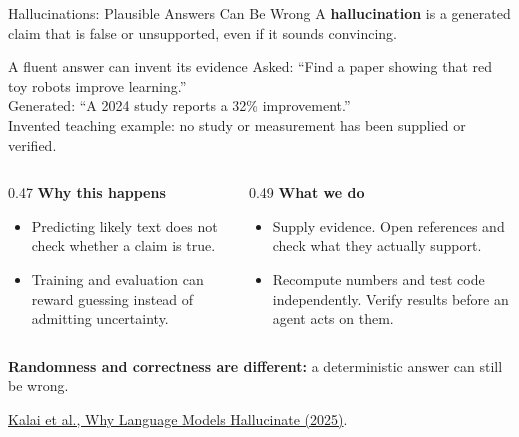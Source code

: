 \documentclass[aspectratio=169]{beamer}
\begin{document}
\begin{frame}{Hallucinations: Plausible Answers Can Be Wrong}
  \small A \textbf{hallucination} is a generated claim that is false or unsupported, even if it sounds convincing.
  \begin{block}{A fluent answer can invent its evidence}
    \small Asked: ``Find a paper showing that red toy robots improve learning.''\\
    Generated: ``A 2024 study reports a 32\% improvement.''\\
    {\footnotesize Invented teaching example: no study or measurement has been supplied or verified.}
  \end{block}
  \begin{columns}[T,onlytextwidth]
    \begin{column}{0.47\textwidth}
      \small \textbf{Why this happens}
      \begin{itemize}
        \item Predicting likely text does not check whether a claim is true.
        \item Training and evaluation can reward guessing instead of admitting uncertainty.
      \end{itemize}
    \end{column}
    \begin{column}{0.49\textwidth}
      \small \textbf{What we do}
      \begin{itemize}
        \item Supply evidence. Open references and check what they actually support.
        \item Recompute numbers and test code independently. Verify results before an agent acts on them.
      \end{itemize}
    \end{column}
  \end{columns}
  \vspace{0.3em}
  \small \textbf{Randomness and correctness are different:} a deterministic answer can still be wrong.
  \par\vspace{0.2em}
  {\scriptsize \href{https://arxiv.org/abs/2509.04664}{Kalai et al., Why Language Models Hallucinate (2025)}.}

\end{frame}
\end{document}
